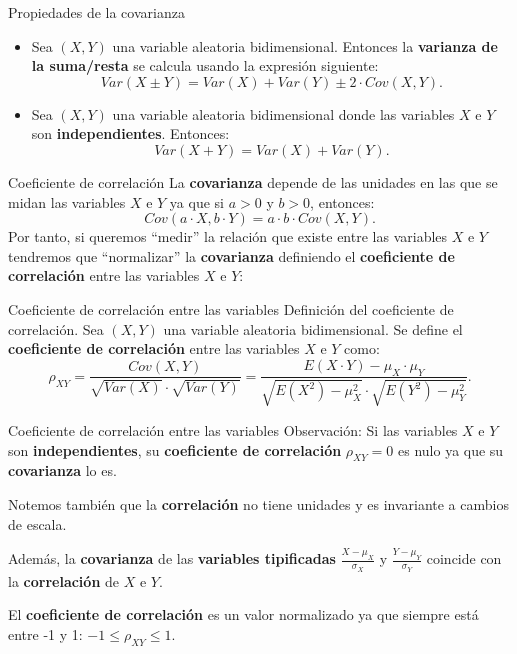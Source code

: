 \documentclass[
  ignorenonframetext,
]{beamer}
\begin{document}
\begin{frame}{Propiedades de la covarianza}
\protect\hypertarget{propiedades-de-la-covarianza}{}
\begin{itemize}
\item
  Sea \((X,Y)\) una variable aleatoria bidimensional. Entonces la
  \textbf{varianza de la suma/resta} se calcula usando la expresión
  siguiente: \[
  Var(X\pm Y)=Var(X)+Var(Y)\pm 2\cdot Cov(X,Y).
  \]
\item
  Sea \((X,Y)\) una variable aleatoria bidimensional donde las variables
  \(X\) e \(Y\) son \textbf{independientes}. Entonces: \[
  Var(X+Y)=Var(X)+Var(Y).
  \]
\end{itemize}
\end{frame}

\begin{frame}{Coeficiente de correlación}
\protect\hypertarget{coeficiente-de-correlaciuxf3n}{}
La \textbf{covarianza} depende de las unidades en las que se midan las
variables \(X\) e \(Y\) ya que si \(a>0\) y \(b>0\), entonces: \[
Cov(a\cdot X,b\cdot Y)=a\cdot b\cdot Cov(X,Y).
\] Por tanto, si queremos ``medir'' la relación que existe entre las
variables \(X\) e \(Y\) tendremos que ``normalizar'' la
\textbf{covarianza} definiendo el \textbf{coeficiente de correlación}
entre las variables \(X\) e \(Y\):
\end{frame}

\begin{frame}{Coeficiente de correlación entre las variables}
\protect\hypertarget{coeficiente-de-correlaciuxf3n-entre-las-variables}{}
Definición del coeficiente de correlación. Sea \((X,Y)\) una variable
aleatoria bidimensional. Se define el \textbf{coeficiente de
correlación} entre las variables \(X\) e \(Y\) como: \[
\rho_{XY}=\frac{Cov(X,Y)}{\sqrt{Var(X)}\cdot\sqrt{Var(Y)}}=\frac{E(X\cdot Y)-\mu_X\cdot \mu_Y}{\sqrt{E\left(X^2\right)-\mu_X^2}\cdot \sqrt{E\left(Y^2\right)-\mu_Y^2}}.
\]
\end{frame}

\begin{frame}{Coeficiente de correlación entre las variables}
\protect\hypertarget{coeficiente-de-correlaciuxf3n-entre-las-variables-1}{}
Observación: Si las variables \(X\) e \(Y\) son \textbf{independientes},
su \textbf{coeficiente de correlación} \(\rho_{XY}=0\) es nulo ya que su
\textbf{covarianza} lo es.

Notemos también que la \textbf{correlación} no tiene unidades y es
invariante a cambios de escala.

Además, la \textbf{covarianza} de las \textbf{variables tipificadas}
\(\frac{X-\mu_X}{\sigma_X}\) y \(\frac{Y-\mu_Y}{\sigma_Y}\) coincide con
la \textbf{correlación} de \(X\) e \(Y\).

El \textbf{coeficiente de correlación} es un valor normalizado ya que
siempre está entre -1 y 1: \(-1\leq\rho_{XY}\leq 1\).
\end{frame}
\end{document}
